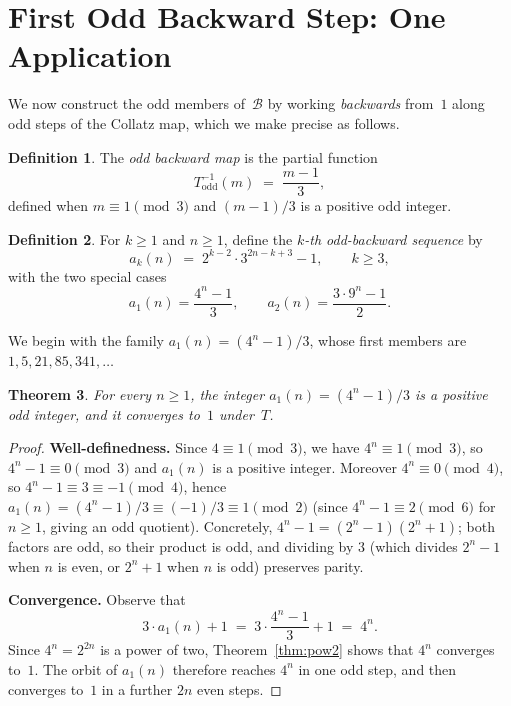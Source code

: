 \documentclass[12pt]{amsart}
\newtheorem{theorem}{Theorem}[section]
\theoremstyle{definition}
\newtheorem{definition}[theorem]{Definition}
\newcommand{\basin}{\mathcal{B}}
\begin{document}
\section{First Odd Backward Step: One Application}\label{sec:oneback}

We now construct the odd members of~$\basin$ by working \emph{backwards}
from~$1$ along odd steps of the Collatz map, which we make precise as follows.

\begin{definition}
  The \emph{odd backward map} is the partial function
  \[
    T_{\mathrm{odd}}^{-1}(m)
    \;=\;
    \frac{m - 1}{3},
  \]
  defined when $m \equiv 1 \pmod{3}$ and $(m-1)/3$ is a positive odd integer.
\end{definition}

\begin{definition}
  For $k \geq 1$ and $n \geq 1$, define the \emph{$k$-th odd-backward
  sequence} by
  \[
    a_k(n) \;=\; 2^{k-2} \cdot 3^{2n - k + 3} - 1, \qquad k \geq 3,
  \]
  with the two special cases
  \[
    a_1(n) = \frac{4^n - 1}{3}, \qquad
    a_2(n) = \frac{3 \cdot 9^n - 1}{2}.
  \]
\end{definition}

We begin with the family $a_1(n) = (4^n - 1)/3$, whose first members are
$1, 5, 21, 85, 341, \ldots$

\begin{theorem}\label{thm:a1}
  For every $n \geq 1$, the integer $a_1(n) = (4^n - 1)/3$ is a positive odd
  integer, and it converges to~$1$ under~$T$.
\end{theorem}

\begin{proof}
  \textbf{Well-definedness.}
  Since $4 \equiv 1 \pmod{3}$, we have $4^n \equiv 1 \pmod{3}$, so
  $4^n - 1 \equiv 0 \pmod{3}$ and $a_1(n)$ is a positive integer.
  Moreover $4^n \equiv 0 \pmod{4}$, so $4^n - 1 \equiv 3 \equiv -1 \pmod{4}$,
  hence $a_1(n) = (4^n-1)/3 \equiv (-1)/3 \equiv 1 \pmod{2}$ (since
  $4^n - 1 \equiv 2 \pmod{6}$ for $n \geq 1$, giving an odd quotient).
  Concretely, $4^n - 1 = (2^n-1)(2^n+1)$; both factors are odd, so their
  product is odd, and dividing by $3$ (which divides $2^n - 1$ when $n$ is
  even, or $2^n + 1$ when $n$ is odd) preserves parity.

  \textbf{Convergence.}
  Observe that
  \[
    3 \cdot a_1(n) + 1
    \;=\;
    3 \cdot \frac{4^n - 1}{3} + 1
    \;=\;
    4^n.
  \]
  Since $4^n = 2^{2n}$ is a power of two, Theorem~\ref{thm:pow2} shows that
  $4^n$ converges to~$1$.  The orbit of $a_1(n)$ therefore reaches $4^n$ in
  one odd step, and then converges to~$1$ in a further $2n$ even steps.
\end{proof}
\end{document}

